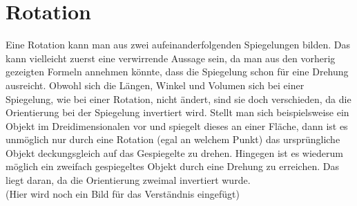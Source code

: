 %
%
%
\section{Rotation}

Eine Rotation kann man aus zwei aufeinanderfolgenden Spiegelungen bilden. Das kann vielleicht zuerst eine verwirrende Aussage sein, da man aus den vorherig gezeigten Formeln annehmen könnte, dass die Spiegelung schon für eine Drehung ausreicht. Obwohl sich die Längen, Winkel und Volumen sich bei einer Spiegelung, wie bei einer Rotation, nicht ändert, sind sie doch verschieden, da die Orientierung bei der Spiegelung invertiert wird. Stellt man sich beispielsweise ein Objekt im Dreidimensionalen vor und spiegelt dieses an einer Fläche, dann ist es unmöglich nur durch eine Rotation (egal an welchem Punkt) das ursprüngliche Objekt deckungsgleich auf das Gespiegelte zu drehen. Hingegen ist es wiederum möglich ein zweifach gespiegeltes Objekt durch eine Drehung zu erreichen. Das liegt daran, da die Orientierung zweimal invertiert wurde.
\\(Hier wird noch ein Bild für das Verständnis eingefügt)

